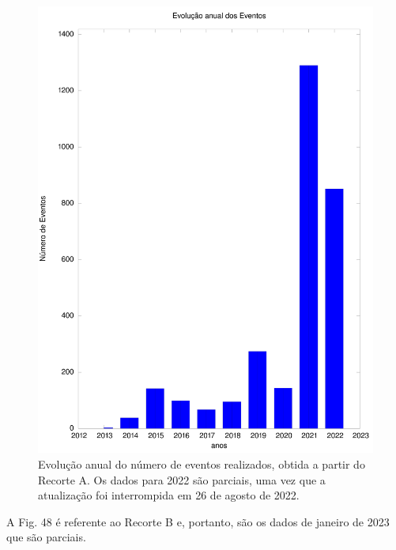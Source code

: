 \documentclass[
12pt,		%
openright,	%
twoside,  %
a4paper,			%
chapter=TITLE,		%
english,			%
french,				%
spanish,			%
brazil				%
]{USPSC-classe/USPSC}
\begin{document}
\captionsetup{format=plain}
\begin{figure}[max size={\textwidth}{\textheight}]

\centering


\begin{minipage}[b]{0.4\linewidth}
        \centering
                \includegraphics[width=1.0\linewidth]{../../imagens/output-eventos.jpeg}
                \caption{Evolu\c{c}\~ao anual do n\'umero de eventos realizados, obtida a partir do Recorte A. Os dados para 2022 s\~ao parciais, uma vez que a atualiza\c{c}\~ao foi interrompida em 26 de agosto de 2022.}
                \label{8af5236ba8f91623157f8f95ae10366b416d6049}
\end{minipage}%
\hspace{0.5cm}
\end{figure}



A Fig. 48 \'e referente ao Recorte B e, portanto, s\~ao os dados de janeiro de 2023 que s\~ao parciais.
\end{document}
